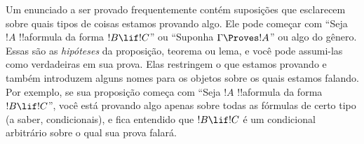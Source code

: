 \documentclass[../../../include/open-logic-section]{subfiles}
\begin{document}
Um enunciado a ser provado frequentemente contém suposições que
esclarecem sobre quais tipos de coisas estamos provando algo. Ele pode
começar com ``Seja $!A$ !!a{formula} da forma $!B \lif !C$'' ou
``Suponha $\Gamma \Proves !A$'' ou algo do gênero.  Essas são as
\emph{hipóteses} da proposição, teorema ou lema, e você pode assumi-las
como verdadeiras em sua prova. Elas restringem o que estamos provando e
também introduzem alguns nomes para os objetos sobre os quais estamos
falando. Por exemplo, se sua proposição começa com ``Seja $!A$
!!a{formula} da forma $!B \lif !C$'', você está provando algo apenas
sobre todas as fórmulas de certo tipo (a saber, condicionais), e fica
entendido que $!B \lif !C$ é um condicional arbitrário sobre o qual sua
prova falará.
\end{document}

